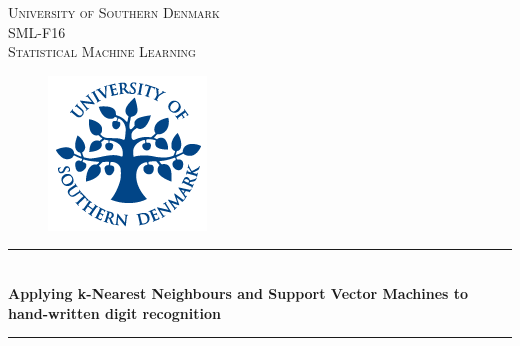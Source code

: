 \documentclass[11pt]{article}
\begin{document}
\begin{titlepage}
\newcommand{\HRule}{\rule{\linewidth}{0.5mm}} %

\center %
 

\textsc{\LARGE University of Southern Denmark}\\[1cm] %
\textsc{\Large SML-F16}\\[0.3cm] %
\textsc{\large Statistical Machine Learning }\\[0.3cm] %
\vspace{0.5cm}
\begin{figure}[H]
\centering
\includegraphics[scale=1]{img/sdu-segl.png}
\end{figure}
\vspace{0.4cm}

\HRule \\[0.4cm]
{ \huge \bfseries Applying k-Nearest Neighbours and Support Vector Machines to hand-written digit recognition}\\[0.4cm] %
\HRule \\[2.5cm]
 


\end{titlepage}
\end{document}
